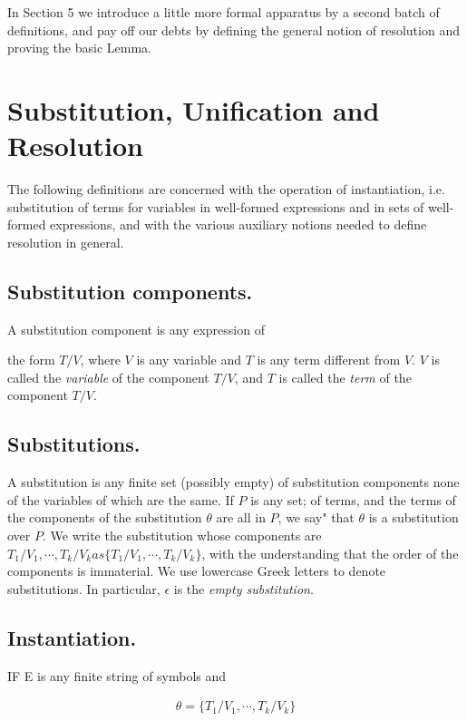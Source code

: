\documentclass[8pt]{extarticle}
\begin{document}
In Section 5 we introduce a little more formal apparatus by a second batch of definitions, and pay off our debts by defining the general notion of resolution and proving the basic Lemma.

\section{Substitution, Unification and Resolution}

The following definitions are concerned with the operation of instantiation, i.e. substitution of terms for variables in well-formed expressions and in sets of well-formed expressions, and with the various auxiliary notions needed to define resolution in general.

\subsection{Substitution components.} A substitution component is any expression of
\newpage

\noindent the form $T/V$, where $V$ is any variable and $T$ is any term different from $V$. $V$ is
called the \emph{variable} of the component $T/V$, and $T$ is called the \emph{term} of the component $T/V$.

\subsection{Substitutions.}

A substitution is any finite set (possibly empty) of substitution components none of the variables of which are the same. If $P$ is any set;
of terms, and the terms of the components of the substitution $\theta$ are all in $P$, we say" that $\theta$ is a substitution over $P$. We write the substitution whose components are $T_1/V_1, \dotsm , T_k/V_k as \{T_1/V_1, \dotsm, T_k/V_k\}$, with the understanding that the order of the components is immaterial. We use lowercase Greek letters to denote substitutions. In particular, $\epsilon$ is the \emph{empty substitution}.

\subsection{Instantiation.}

IF E is any finite string of symbols and

\begin{align*}
    \theta = \{T_1/V_1, \dotsm, T_k/V_k\}
\end{align*}
\end{document}

